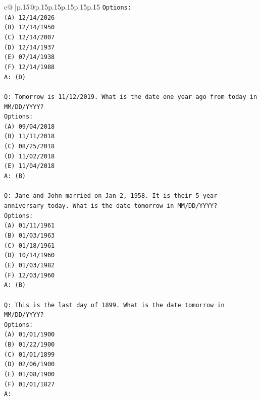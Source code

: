 \documentclass{article}
\begin{document}
{\begin{supertabular}{c@{$\;$}|p{.15\linewidth}@{}p{.15\linewidth}p{.15\linewidth}p{.15\linewidth}p{.15\linewidth}p{.15\linewidth}}
{{{\texttt{Options:} \\
\texttt{(A) 12/14/2026} \\
\texttt{(B) 12/14/1950} \\
\texttt{(C) 12/14/2007} \\
\texttt{(D) 12/14/1937} \\
\texttt{(E) 07/14/1938} \\
\texttt{(F) 12/14/1988} \\
\texttt{A: (D)} \\
\\ 
\texttt{Q: Tomorrow is 11/12/2019. What is the date one year ago from today in MM/DD/YYYY?} \\
\texttt{Options:} \\
\texttt{(A) 09/04/2018} \\
\texttt{(B) 11/11/2018} \\
\texttt{(C) 08/25/2018} \\
\texttt{(D) 11/02/2018} \\
\texttt{(E) 11/04/2018} \\
\texttt{A: (B)} \\
\\ 
\texttt{Q: Jane and John married on Jan 2, 1958. It is their 5{-}year anniversary today. What is the date tomorrow in MM/DD/YYYY?} \\
\texttt{Options:} \\
\texttt{(A) 01/11/1961} \\
\texttt{(B) 01/03/1963} \\
\texttt{(C) 01/18/1961} \\
\texttt{(D) 10/14/1960} \\
\texttt{(E) 01/03/1982} \\
\texttt{(F) 12/03/1960} \\
\texttt{A: (B)} \\
\\ 
\texttt{Q: This is the last day of 1899. What is the date tomorrow in MM/DD/YYYY?} \\
\texttt{Options:} \\
\texttt{(A) 01/01/1900} \\
\texttt{(B) 01/22/1900} \\
\texttt{(C) 01/01/1899} \\
\texttt{(D) 02/06/1900} \\
\texttt{(E) 01/08/1900} \\
\texttt{(F) 01/01/1827} \\
\texttt{A:} \\
            }
        }
    }
     \\ \\


\end{supertabular}}
\end{document}
